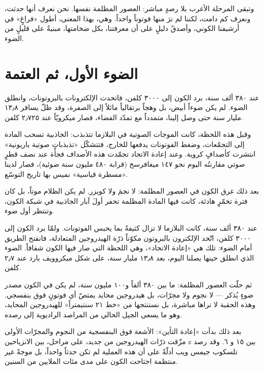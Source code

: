 \documentclass[12pt,a4paper,openany]{book}
\begin{document}
وتبقى المرحلة الأغرب بلا رصدٍ مباشر: العصور المظلمة نفسها. نحن نعرف أنها حدثت، ونعرف كم دامت، لكننا لم نرَ منها فوتوناً واحداً. وهي، بهذا المعنى، أطول «فراغٍ» في أرشيفنا الكوني، وأصدقُ دليلٍ على أن معرفتنا، بكل ضخامتها، مبنيةٌ على قليلٍ من الضوء.


\chapter*{الضوء الأول، ثم العتمة}




عند ٣٨٠ ألف سنة، برد الكون إلى ٣٠٠٠ كلفن، فاتحدت الإلكترونات بالبروتونات، وانطلق الضوء. لم يكن ضوءاً أبيض، بل وهجاً برتقالياً مائلاً إلى الصفرة، وقد ظلّ يسافر ١٣٫٨ مليار سنة حتى وصل إلينا، متمدداً مع تمدّد الفضاء، فصار ميكرويّاً عند ٢٫٧٢٥ كلفن.


وقبل هذه اللحظة، كانت الموجات الصوتية في البلازما تتذبذب: الجاذبية تسحب المادة إلى التجمّعات، وضغط الفوتونات يدفعها للخارج، فتتشكّل «تذبذباتٍ صوتية باريونية» انتشرت كأصدافٍ كروية. وعند إعادة الاتحاد تجمّدت هذه الأصداف فجأة عند نصف قطرٍ صوتي مقارنتُه اليوم نحو ١٤٧ ميغافرسخ (قرابة ٤٨٠ مليون سنة ضوئية)، فصار لدينا «مسطرة قياسية» نميس بها تاريخ التوسّع.


بعد ذلك غرق الكون في العصور المظلمة: لا نجمَ ولا كويزر. لم يكن الظلام موتاً، بل كان فترة تخمّرٍ هادئة، كانت فيها المادة المظلمة تحفر أولَ آبار الجاذبية في شبكة الكون، وتنتظر أول ضوء.


عند ٣٨٠ ألف سنة، كانت البلازما لا تزال كثيفةً بما يحبس الفوتونات. ولمّا برد الكون إلى ٣٠٠٠ كلفن، اتّحد الإلكترون بالبروتون مكوّناً ذرّة الهيدروجين المتعادلة، فانفتح الطريق أمام الضوء: تلك هي «إعادة الاتحاد»، وهي اللحظة التي صار فيها الكون شفافاً. الضوء الذي انطلق حينها يصلنا اليوم، بعد ١٣٫٨ مليار سنة، على شكل ميكروويف بارد عند ٢٫٧ كلفن.


ثم حلّت العصور المظلمة: ما بين ٣٨٠ ألفاً و١٠٠ مليون سنة، لم يكن في الكون مصدر ضوءٍ يُذكر — لا نجوم ولا مجرّات، بل هيدروجين محايد يمتصّ أي فوتونٍ فوق بنفسجي. وهذه الحقبة لا نراها مباشرة، بل نستنتجها من «خط ٢١ سنتيمتراً» للهيدروجين المحايد، وهو ما يسعى الجيل الحالي من المراصد الراديوية إلى رصده.


بعد ذلك بدأت «إعادة التأين»: الأشعة فوق البنفسجية من النجوم والمجرّات الأولى مزّقت ذرّات الهيدروجين من جديد، على مراحل، بين الانزياحين z بين ١٥ و ٦. وقد رصد تلسكوب جيمس ويب أدلّةً على أن هذه العملية لم تكن حدثاً واحداً، بل موجةً غير منتظمة اجتاحت الكون على مدى مئات الملايين من السنين.
\end{document}
